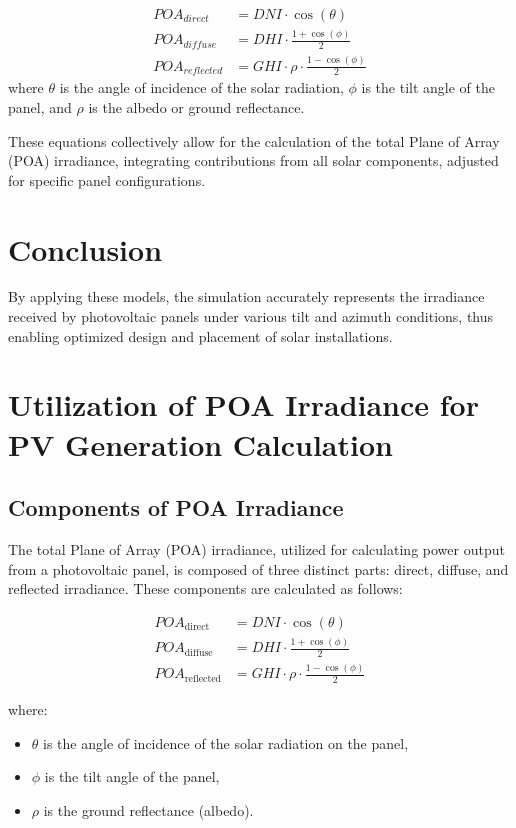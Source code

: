 \begin{align}
POA_{direct} &= DNI \cdot \cos(\theta) \\
POA_{diffuse} &= DHI \cdot \frac{1 + \cos(\phi)}{2} \\
POA_{reflected} &= GHI \cdot \rho \cdot \frac{1 - \cos(\phi)}{2}
\label{eq:poa_irradiance}
\end{align}
where \( \theta \) is the angle of incidence of the solar radiation, \( \phi \) is the tilt angle of the panel, and \( \rho \) is the albedo or ground reflectance.

These equations collectively allow for the calculation of the total Plane of Array (POA) irradiance, integrating contributions from all solar components, adjusted for specific panel configurations.

\section{Conclusion}
By applying these models, the simulation accurately represents the irradiance received by photovoltaic panels under various tilt and azimuth conditions, thus enabling optimized design and placement of solar installations.
\section{Utilization of POA Irradiance for PV Generation Calculation}

\subsection{Components of POA Irradiance}
The total Plane of Array (POA) irradiance, utilized for calculating power output from a photovoltaic panel, is composed of three distinct parts: direct, diffuse, and reflected irradiance. These components are calculated as follows:

\begin{align}
POA_{\text{direct}} &= DNI \cdot \cos(\theta) \\
POA_{\text{diffuse}} &= DHI \cdot \frac{1 + \cos(\phi)}{2} \\
POA_{\text{reflected}} &= GHI \cdot \rho \cdot \frac{1 - \cos(\phi)}{2}
\end{align}

where:
\begin{itemize}
    \item \( \theta \) is the angle of incidence of the solar radiation on the panel,
    \item \( \phi \) is the tilt angle of the panel,
    \item \( \rho \) is the ground reflectance (albedo).
\end{itemize}

